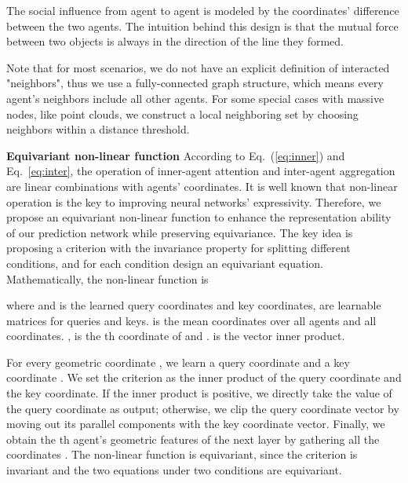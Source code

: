 \documentclass[10pt,twocolumn,letterpaper]{article}
\begin{document}
The social influence from agent  to agent  is modeled by the coordinates' difference between the two agents. The intuition behind this design is that the mutual force between two objects is always in the direction of the line they formed. 


Note that for most scenarios, we do not have an explicit definition of interacted "neighbors", thus we use a fully-connected graph structure, which means every agent's neighbors include all other agents. For some special cases with massive nodes, like point clouds, we construct a local neighboring set by choosing neighbors within a distance threshold.


\textbf{Equivariant non-linear function}
According to Eq.~(\ref{eq:inner}) and Eq.~\eqref{eq:inter}, the operation of inner-agent attention and inter-agent aggregation are linear combinations with agents' coordinates. It is well known that non-linear operation is the key to improving neural networks' expressivity. Therefore, we propose an equivariant non-linear function to enhance the representation ability of our prediction network while preserving equivariance. The key idea is proposing a criterion with the invariance property for splitting different conditions, 
and for each condition design an equivariant equation.
Mathematically, the non-linear function is

where  and   is the learned query coordinates and key coordinates,  are learnable matrices for queries and keys.  is the mean coordinates over all agents and all coordinates. ,  is the th coordinate of  and . 
is the vector inner product.

For every geometric coordinate , we learn a query coordinate  and a key coordinate . We set the criterion as the inner product of the query coordinate and the key coordinate. If the inner product is positive, we directly take the value of the query coordinate as output; otherwise, we clip the query coordinate vector by moving out its parallel components with the key coordinate vector. Finally, we obtain the 
th agent's geometric features of the next layer  by gathering all the coordinates . The non-linear function is equivariant, since the criterion is invariant and the two equations under two conditions are equivariant. 
\end{document}
